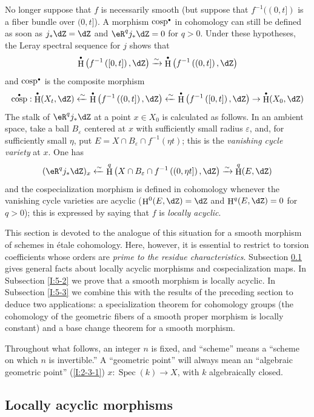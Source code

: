 \documentclass[12pt,oneside,english]{smfbook}
\DeclareMathOperator{\cosp}{cosp}
\DeclareMathOperator{\h}{H}
\DeclareMathOperator{\spec}{Spec}
\newcounter{char}
\newcommand{\iso}{\xrightarrow\sim}
\let\oldbullet\bullet
\renewcommand{\bullet}{\textnormal{\tiny$\oldbullet$}}
\begin{document}
No longer suppose that $f$ is necessarily smooth (but suppose that $f^{-1}((0,t])$ is a fiber bundle over $(0,t]$). A morphism $\cosp^\bullet$ in cohomology can still be defined as soon as $j_*\dZ=\dZ$ and $\eR^qj_*\dZ=0$ for $q>0$. Under these hypotheses, the Leray spectral sequence for $j$ shows that
\[
  \h^\bullet\left(f^{-1}\left([0,t]\right),\dZ\right) \iso \h^\bullet\left(f^{-1}\left((0,t]\right),\dZ\right)
\]
and $\cosp^\bullet$ is the composite morphism
\[
  \cosp^\bullet : \h^\bullet(X_t,\dZ)
    \xleftarrow\sim \h^\bullet\left(f^{-1}\left((0,t]\right),\dZ\right)
    \xleftarrow\sim \h^\bullet\left(f^{-1}\left([0,t]\right),\dZ\right)
    \to \h^\bullet(X_0,\dZ)
\]
The stalk of $\eR^qj_*\dZ$ at a point $x\in X_0$ is calculated as follows. In an ambient space, take a ball $B_\varepsilon$ centered at $x$ with sufficiently small radius $\varepsilon$, and, for sufficiently small $\eta$, put $E=X\cap B_\varepsilon\cap f^{-1}(\eta t)$; this is the \emph{vanishing cycle variety} at $x$. One has
\[
  (\eR^q j_* \dZ)_x \xleftarrow\sim \h^q\left(X\cap B_\varepsilon\cap f^{-1}\left((0,\eta t]\right),\dZ\right) \xrightarrow\sim \h^q(E,\dZ)
\]
and the cospecialization morphism is defined in cohomology whenever the vanishing cycle varieties are acyclic ($\h^0(E,\dZ)=\dZ$ and $\h^q(E,\dZ)=0$ for $q>0$); this is expressed by saying that $f$ is \emph{locally acyclic}.

This section is devoted to the analogue of this situation for a smooth morphism of schemes in étale cohomology. Here, however, it is essential to restrict to torsion coefficients whose orders are \emph{prime to the residue characteristics}. Subsection \ref{I:5-1} gives general facts about locally acyclic morphisms and cospecialization maps. In Subsection \ref{I:5-2} we prove that a smooth morphism is locally acyclic. In Subsection \ref{I:5-3} we combine this with the results of the preceding section to deduce two applications: a specialization theorem for cohomology groups (the cohomology of the geometric fibers of a smooth proper morphism is locally constant) and a base change theorem for a smooth morphism.

Throughout what follows, an integer $n$ is fixed, and ``scheme'' means a ``scheme on which $n$ is invertible.'' A ``geometric point'' will always mean an ``algebraic geometric point'' (\ref{I:2-3-1}) $x:\spec(k)\to X$, with $k$ algebraically closed.

\subsection{Locally acyclic morphisms}\label{I:5-1}
\end{document}
